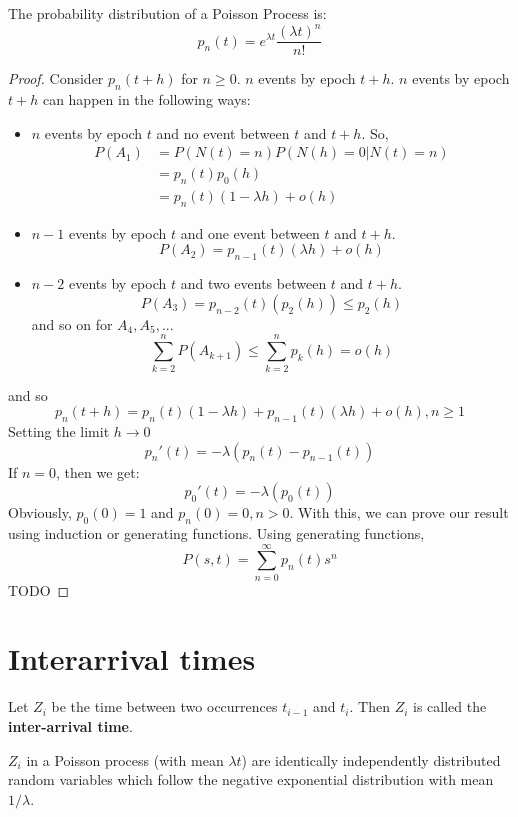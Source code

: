 \documentclass[12pt,letterpaper]{book}
\theoremstyle{definition}
\begin{document}
\begin{theorem}
  The probability distribution of a Poisson Process is:
  \[p_n(t) = e^{\lambda t} \frac{(\lambda t)^n}{n!}\]
\end{theorem}
\begin{proof}
  Consider $p_n(t+h)$ for $n \geq 0$. $n$ events by epoch $t+h$. $n$ events by epoch $t+h$ can happen in the following ways:
  \begin{itemize}
    \item $n$ events by epoch $t$ and no event between $t$ and $t+h$. So,
      \begin{align*}
        P(A_1) &= P(N(t) = n) P(N(h) = 0 | N(t) = n) \\
               &= p_n(t) p_0(h)\\
               &= p_n(t)(1-\lambda h) + o(h)
      \end{align*}
    \item  $n-1$ events by epoch $t$ and one event between $t$ and $t+h$.
      \[P(A_2) = p_{n-1}(t) (\lambda h) + o(h)\]
    \item $n-2$ events by epoch $t$ and two events between $t$ and $t+h$.
      \[P(A_3) = p_{n-2}(t) (p_2(h)) \leq p_2(h)\]
      and so on for $A_4, A_5, ...$
      \[\sum_{k=2}^n P(A_{k+1}) \leq \sum_{k=2}^n p_k(h) = o(h)\]
  \end{itemize}
  and so
      \[p_n(t+h) = p_n(t) (1- \lambda h) + p_{n-1}(t) (\lambda h) + o(h), n \geq 1\]
      Setting the limit $h \rightarrow 0$
      \[p_n'(t) = -\lambda (p_n(t) - p_{n-1}(t))\]
      If $n =0$, then we get:
      \[p_0'(t) = -\lambda(p_0(t))\]
      Obviously, $p_0(0) = 1$ and $p_n(0) = 0, n > 0$.
  With this, we can prove our result using induction or generating functions. Using generating functions,
  \[P(s,t) = \sum_{n=0}^{\infty} p_n(t)s^n\]
  TODO
\end{proof}

\section{Interarrival times}

Let $Z_i$ be the time between two occurrences $t_{i-1}$ and $t_i$. Then $Z_i$ is called the \textbf{inter-arrival time}.

\begin{theorem}
  $Z_i$ in a Poisson process (with mean $\lambda t$) are identically independently distributed random variables which follow the negative exponential distribution with mean $1/\lambda$.
\end{theorem}
\end{document}
